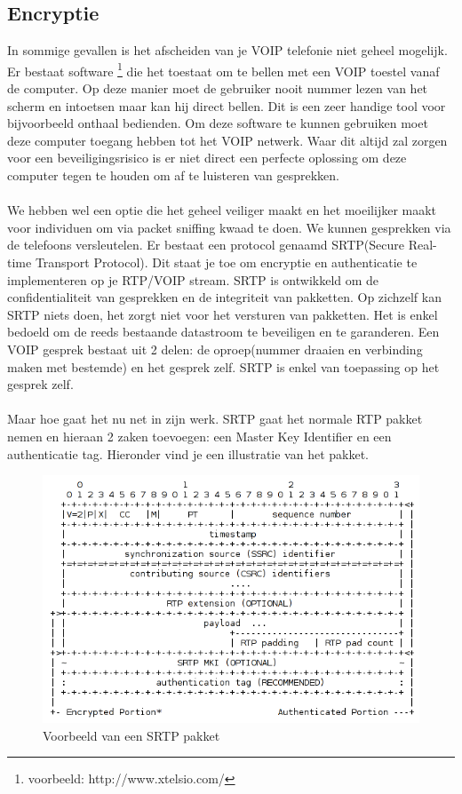\documentclass[pdftex,a4paper,12pt,twoside]{report}
\begin{document}
\subsection{Encryptie}
In sommige gevallen is het afscheiden van je VOIP telefonie niet geheel mogelijk. Er bestaat software \footnote{voorbeeld: http://www.xtelsio.com/} die het toestaat om te bellen met een VOIP toestel vanaf de computer. Op deze manier moet de gebruiker nooit nummer lezen van het scherm en intoetsen maar kan hij direct bellen. Dit is een zeer handige tool voor bijvoorbeeld onthaal bedienden. Om deze software te kunnen gebruiken moet deze computer toegang hebben tot het VOIP netwerk. Waar dit altijd zal zorgen voor een beveiligingsrisico is er niet direct een perfecte oplossing om deze computer tegen te houden om af te luisteren van gesprekken. \\ \\
We hebben wel een optie die het geheel veiliger maakt en het moeilijker maakt voor individuen om via packet sniffing kwaad te doen. We kunnen gesprekken via de telefoons versleutelen. Er bestaat een protocol genaamd SRTP(Secure Real-time Transport Protocol). Dit staat je toe om encryptie en authenticatie te implementeren op je RTP/VOIP stream. SRTP is ontwikkeld om de confidentialiteit van gesprekken en de integriteit van pakketten. Op zichzelf kan SRTP niets doen, het zorgt niet voor het versturen van pakketten. Het is enkel bedoeld om de reeds bestaande datastroom te beveiligen en te garanderen. Een VOIP gesprek bestaat uit 2 delen: de oproep(nummer draaien en verbinding maken met bestemde) en het gesprek zelf. SRTP is enkel van toepassing op het gesprek zelf. \\ \\
Maar hoe gaat het nu net in zijn werk. SRTP gaat het normale RTP pakket nemen en hieraan 2 zaken toevoegen: een Master Key Identifier en een authenticatie tag. Hieronder vind je een illustratie van het pakket. 
\newpage

\begin{figure}[H]
\caption{Voorbeeld van een SRTP pakket \protect \footnotemark}
\includegraphics[scale=0.8]{img/SRTP}
\end{figure}
\end{document}
